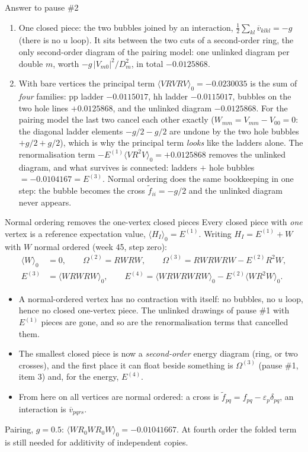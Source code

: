 \documentclass[aspectratio=169,10pt]{beamer}
\newcounter{thinkctr}
\newcommand{\thinka}[1]{%
  \vfill
  \begin{tcolorbox}[enhanced,colback=paleteal,colframe=teal,boxrule=1.2pt,arc=4pt,
    grow to left by=6mm,grow to right by=6mm,
    left=16pt,right=16pt,top=16pt,bottom=18pt,
    fonttitle=\bfseries\Large,fontupper=\large,
    title={Answer to pause \#\thethinkctr}]
  #1
  \end{tcolorbox}
  \vfill}
\newcommand{\av}[1]{\langle #1\rangle_0}
\newcommand{\vbar}[4]{\overline v_{#1#2#3#4}}
\newcommand{\ftil}[1]{\tilde f_{#1}}
\begin{document}
\begin{frame}{Answer to pause \#2}
\thinka{\footnotesize%
\begin{enumerate}
\item One closed piece: the two bubbles joined by an interaction, $\tfrac12\sum_{kl}\vbar{k}{l}{k}{l}=-g$ (there is no $u$ loop). It sits between the two cuts of a second-order ring, the only second-order diagram of the pairing model: one unlinked diagram per double $m$, worth $-g\,|V_{m0}|^2/D_m^2$, in total $-0.0125868$.
\item With bare vertices the principal term $\av{VRVRV}=-0.0230035$ is the sum of \emph{four} families: pp ladder $-0.0115017$, hh ladder $-0.0115017$, bubbles on the two hole lines $+0.0125868$, and the unlinked diagram $-0.0125868$. For the pairing model the last two cancel each other exactly ($W_{mm}=V_{mm}-V_{00}=0$: the diagonal ladder elements $-g/2-g/2$ are undone by the two hole bubbles $+g/2+g/2$), which is why the principal term \emph{looks} like the ladders alone. The renormalisation term $-E^{(1)}\av{VR^2V}=+0.0125868$ removes the unlinked diagram, and what survives is connected: ladders $+$ hole bubbles $=-0.0104167=E^{(3)}$. Normal ordering does the same bookkeeping in one step: the bubble becomes the cross $\ftil{ii}=-g/2$ and the unlinked diagram never appears.
\end{enumerate}}
\end{frame}
\begin{frame}{Normal ordering removes the one-vertex closed pieces}
\small
\small
Every closed piece with \emph{one} vertex is a reference expectation value, $\av{H_I}=E^{(1)}$. Writing $H_I=E^{(1)}+W$ with $W$ normal ordered (week 45, step zero):
\begin{align*}
\av{W}&=0,\qquad
\Omega^{(2)}=RWRW,\qquad \Omega^{(3)}=RWRWRW-E^{(2)}R^2W,\\
E^{(3)}&=\av{WRWRW},\qquad E^{(4)}=\av{WRWRWRW}-E^{(2)}\av{WR^2W}.
\end{align*}
\begin{itemize}
\item A normal-ordered vertex has no contraction with itself: no bubbles, no $u$ loop, hence no closed one-vertex piece. The unlinked drawings of pause \#1 with $E^{(1)}$ pieces are gone, and so are the renormalisation terms that cancelled them.
\item The smallest closed piece is now a \emph{second-order} energy diagram (ring, or two crosses), and the first place it can float beside something is $\Omega^{(3)}$ (pause \#1, item 3) and, for the energy, $E^{(4)}$.
\item From here on all vertices are normal ordered: a cross is $\ftil{pq}=f_{pq}-\varepsilon_p\delta_{pq}$, an interaction is $\vbar{p}{q}{r}{s}$.
\end{itemize}
Pairing, $g=0.5$: $\av{WR_0WR_0W}=-0.01041667$. At fourth order the folded term is still needed for additivity of independent copies.
\end{frame}
\end{document}
